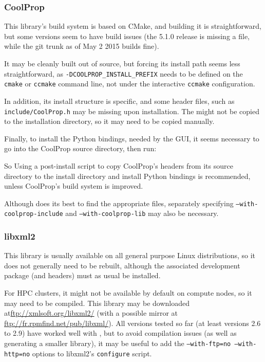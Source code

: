 \documentclass[a4paper,10pt,twoside]{csshortdoc}
\begin{document}
\subsubsection{CoolProp\label{sec:ext:coolprop}}

This library's build system is based on CMake, and building it
is straightforward, but some versions seem to have build
issues (the 5.1.0 release is missing a file, while the git trunk
as of May 2 2015 builds fine).

\sloppy

It may be cleanly built out of source, but forcing its install path
seems less straightforward, as \texttt{-DCOOLPROP\_INSTALL\_PREFIX}
needs to be defined on the \texttt{cmake} or \texttt{ccmake}
command line, not under the interactive \texttt{ccmake} configuration.

In addition, its install structure is specific, and some header files,
such as \texttt{include/CoolProp.h} may be missing upon installation.
The  might not be copied to the installation directory, so it may need
to be copied manually.

Finally, to install the Python bindings, needed by the \CS GUI,
it seems necessary to go into the CoolProp source directory, then run:


So Using a post-install script to copy CoolProp's
headers from its source directory to the install directory
and install Python bindings is recommended, unless CoolProp's
build system is improved.

Although \CS does its best to find the appropriate files, separately specifying
\texttt{--with-coolprop-include} and \texttt{--with-coolprop-lib}
may also be necessary.

\subsubsection{libxml2\label{sec:ext:libxml2}}

This library is usually available on all general purpose Linux
distributions, so it does not generally need to be rebuilt,
although the associated development package (and headers) must
as usual be installed.

For HPC clusters, it might not be available by default on compute nodes,
so it may need to be compiled. This library may be downloaded
at\url{ftp://xmlsoft.org/libxml2/} (with a possible mirror at
\url{ftp://fr.rpmfind.net/pub/libxml/}). All versions tested so far
(at least versions 2.6 to 2.9) have worked well with \CS, but to avoid
compilation issues (as well as generating a smaller library), it
may be useful to add the \texttt{--with-ftp=no --with-http=no} options
to libxml2's \texttt{configure} script.
\end{document}
